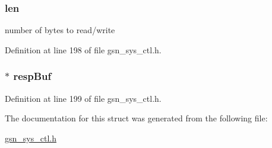 \hypertarget{a00250_ab9abc6ede61238a05664f9c37e4412c3}{
\subsubsection[{len}]{ {\bf len}}}
\label{a00250_ab9abc6ede61238a05664f9c37e4412c3}
number of bytes to read/write 

Definition at line 198 of file gsn\_\-sys\_\-ctl.h.

\hypertarget{a00250_a2290ebad3b4d5d62d0d60f961557d3bb}{
\subsubsection[{respBuf}]{$\ast$ {\bf respBuf}}}
\label{a00250_a2290ebad3b4d5d62d0d60f961557d3bb}


Definition at line 199 of file gsn\_\-sys\_\-ctl.h.



The documentation for this struct was generated from the following file:\begin{DoxyCompactItemize}
\item 
\hyperlink{a00592}{gsn\_\-sys\_\-ctl.h}\end{DoxyCompactItemize}
